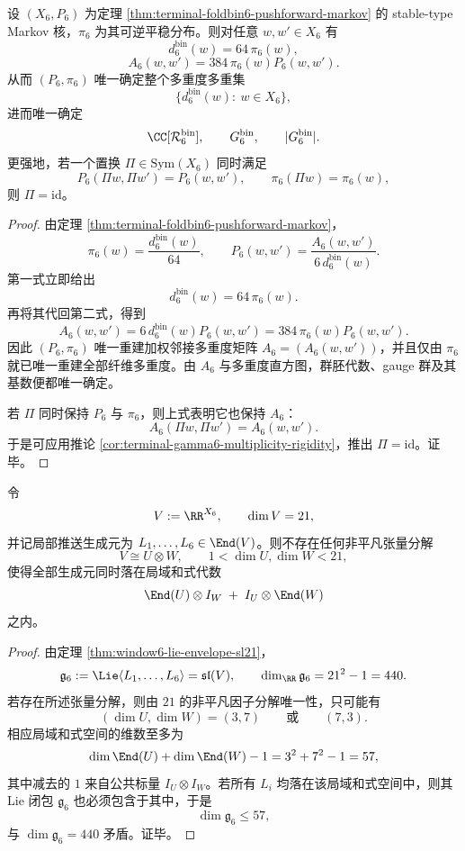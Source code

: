 \begin{theorem}\label{thm:conclusion-window6-markov-stationary-data-rigidly-recovers-multiplicity}
设 \((X_6,P_6)\) 为定理 \ref{thm:terminal-foldbin6-pushforward-markov} 的 stable-type Markov 核，\(\pi_6\) 为其可逆平稳分布。则对任意 \(w,w'\in X_6\) 有
\[
d_6^{\mathrm{bin}}(w)=64\,\pi_6(w),
\]
\[
A_6(w,w')=384\,\pi_6(w)P_6(w,w').
\]
从而 \((P_6,\pi_6)\) 唯一确定整个多重度多重集
\[
\{d_6^{\mathrm{bin}}(w):\ w\in X_6\},
\]
进而唯一确定
\[
\CC[\mathcal R_6^{\mathrm{bin}}],
\qquad
G_6^{\mathrm{bin}},
\qquad
|G_6^{\mathrm{bin}}|.
\]
更强地，若一个置换 \(\Pi\in \mathrm{Sym}(X_6)\) 同时满足
\[
P_6(\Pi w,\Pi w')=P_6(w,w'),
\qquad
\pi_6(\Pi w)=\pi_6(w),
\]
则 \(\Pi=\mathrm{id}\)。
\end{theorem}
\begin{proof}
由定理 \ref{thm:terminal-foldbin6-pushforward-markov}，
\[
\pi_6(w)=\frac{d_6^{\mathrm{bin}}(w)}{64},
\qquad
P_6(w,w')=\frac{A_6(w,w')}{6\,d_6^{\mathrm{bin}}(w)}.
\]
第一式立即给出
\[
d_6^{\mathrm{bin}}(w)=64\,\pi_6(w).
\]
再将其代回第二式，得到
\[
A_6(w,w')=6\,d_6^{\mathrm{bin}}(w)P_6(w,w')
=
384\,\pi_6(w)P_6(w,w').
\]
因此 \((P_6,\pi_6)\) 唯一重建加权邻接多重度矩阵 \(A_6=(A_6(w,w'))\)，并且仅由 \(\pi_6\) 就已唯一重建全部纤维多重度。由 \(A_6\) 与多重度直方图，群胚代数、gauge 群及其基数便都唯一确定。

若 \(\Pi\) 同时保持 \(P_6\) 与 \(\pi_6\)，则上式表明它也保持 \(A_6\)：
\[
A_6(\Pi w,\Pi w')=A_6(w,w').
\]
于是可应用推论 \ref{cor:terminal-gamma6-multiplicity-rigidity}，推出 \(\Pi=\mathrm{id}\)。证毕。
\end{proof}

\begin{theorem}\label{thm:conclusion-window6-typelayer-tensor-indecomposability}
令
\[
V:=\RR^{X_6},
\qquad
\dim V=21,
\]
并记局部推送生成元为 \(L_1,\dots,L_6\in \End(V)\)。则不存在任何非平凡张量分解
\[
V\cong U\otimes W,
\qquad
1<\dim U,\dim W<21,
\]
使得全部生成元同时落在局域和式代数
\[
\End(U)\otimes I_W\;+\;I_U\otimes \End(W)
\]
之内。
\end{theorem}
\begin{proof}
由定理 \ref{thm:window6-lie-envelope-sl21}，
\[
\mathfrak g_6:=\Lie\langle L_1,\dots,L_6\rangle=\mathfrak{sl}(V),
\qquad
\dim_{\RR}\mathfrak g_6=21^2-1=440.
\]
若存在所述张量分解，则由 \(21\) 的非平凡因子分解唯一性，只可能有
\[
(\dim U,\dim W)=(3,7)
\qquad\text{或}\qquad
(7,3).
\]
相应局域和式空间的维数至多为
\[
\dim \End(U)+\dim \End(W)-1
=
3^2+7^2-1
=
57,
\]
其中减去的 \(1\) 来自公共标量 \(I_U\otimes I_W\)。若所有 \(L_i\) 均落在该局域和式空间中，则其 Lie 闭包 \(\mathfrak g_6\) 也必须包含于其中，于是
\[
\dim \mathfrak g_6\le 57,
\]
与 \(\dim\mathfrak g_6=440\) 矛盾。证毕。
\end{proof}

